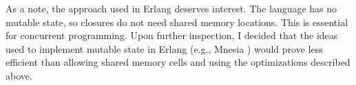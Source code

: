 As a note, the approach used in Erlang \cite{carlsson2004cel} deserves interest.
The language has no mutable state, so closures do not need shared memory
locations. This is essential for concurrent programming. Upon further
inspection, I decided that the ideas used to implement mutable state in
Erlang (e.g., Mnesia \cite{mattsson1999mdr}) would prove less efficient than
allowing shared memory cells and using the optimizations described above.

